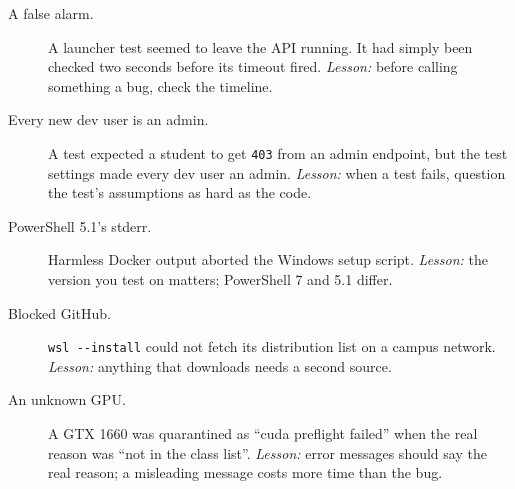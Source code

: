 \begin{description}
\item[A false alarm.] A launcher test seemed to leave the API running. It had
  simply been checked two seconds before its timeout fired.
  \emph{Lesson:} before calling something a bug, check the timeline.

\item[Every new dev user is an admin.] A test expected a student to get
  \texttt{403} from an admin endpoint, but the test settings made every dev user
  an admin.
  \emph{Lesson:} when a test fails, question the test's assumptions as hard as
  the code.

\item[PowerShell 5.1's stderr.] Harmless Docker output aborted the Windows
  setup script.
  \emph{Lesson:} the version you test on matters; PowerShell 7 and 5.1 differ.

\item[Blocked GitHub.] \verb|wsl --install| could not fetch its distribution
  list on a campus network.
  \emph{Lesson:} anything that downloads needs a second source.

\item[An unknown GPU.] A GTX 1660 was quarantined as ``cuda preflight failed''
  when the real reason was ``not in the class list''.
  \emph{Lesson:} error messages should say the real reason; a misleading message
  costs more time than the bug.
\end{description}
